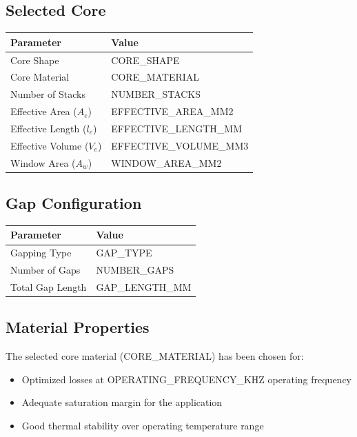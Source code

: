 \documentclass[11pt,a4paper]{article}
\begin{document}
\subsection{Selected Core}
\begin{longtable}{|l|l|}
\hline
\textbf{Parameter} & \textbf{Value} \\
\hline
Core Shape & {{CORE_SHAPE}} \\
\hline
Core Material & {{CORE_MATERIAL}} \\
\hline
Number of Stacks & {{NUMBER_STACKS}} \\
\hline
Effective Area ($A_e$) & {{EFFECTIVE_AREA_MM2}} \\
\hline
Effective Length ($l_e$) & {{EFFECTIVE_LENGTH_MM}} \\
\hline
Effective Volume ($V_e$) & {{EFFECTIVE_VOLUME_MM3}} \\
\hline
Window Area ($A_w$) & {{WINDOW_AREA_MM2}} \\
\hline
\end{longtable}

\subsection{Gap Configuration}
\begin{longtable}{|l|l|}
\hline
\textbf{Parameter} & \textbf{Value} \\
\hline
Gapping Type & {{GAP_TYPE}} \\
\hline
Number of Gaps & {{NUMBER_GAPS}} \\
\hline
Total Gap Length & {{GAP_LENGTH_MM}} \\
\hline
\end{longtable}

\subsection{Material Properties}
The selected core material ({{CORE_MATERIAL}}) has been chosen for:
\begin{itemize}
    \item Optimized losses at {{OPERATING_FREQUENCY_KHZ}} operating frequency
    \item Adequate saturation margin for the application
    \item Good thermal stability over operating temperature range
\end{itemize}

\end{document}
